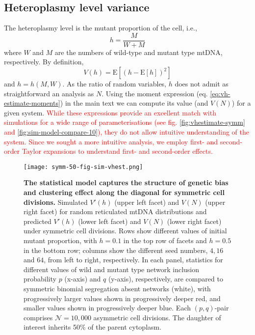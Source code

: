 \documentclass{article}
\begin{document}
\begin{appendices}
\section{Heteroplasmy level variance}\label{app:vh-est}
The heteroplasmy level is the mutant proportion of the cell, i.e.,
\begin{equation*}
    h=\frac{M}{W+M}
\end{equation*}
where $W$ and $M$ are the numbers of wild-type and mutant type mtDNA, respectively. By definition,
\begin{equation*}\label{eq:app-vhest}
    V(h)=\mathrm{E}\left[(h-\mathrm{E}[h])^2\right]
\end{equation*}
and $h=h(M,W)$. As the ratio of random variables, $h$ does not admit as straightforward an analysis as $N$. Using the moment expression (eq. \ref{eq:vh-estimate-moments}) in the main text we can compute its value (and $V(N)$) for a given system. \textcolor{red}{While these expressions provide an excellent match with simulations for a wide range of parameterisations (see fig. \ref{fig:vhestimate-symm} and \ref{fig:sim-model-compare-10}), they do not allow intuitive understanding of the system. Since we sought a more intuitive analysis, we employ first- and second-order Taylor expansions to understand first- and second-order effects.}%


\begin{figure}
\centering
\texttt{[image: symm-50-fig-sim-vhest.png]}
\caption{\textbf{The statistical model captures the structure of genetic bias and clustering effect along the diagonal for symmetric cell divisions.} Simulated $V'(h)$ (upper left facet) and $V(N)$ (upper right facet) for random reticulated mtDNA distributions and predicted $V'(h)$ (lower left facet) and $V(N)$ (lower right facet) under symmetric cell divisions. Rows show different values of initial mutant proportion, with $h=0.1$ in the top row of facets and $h=0.5$ in the bottom row; columns show the different seed numbers, $4, 16$ and $64$, from left to right, respectively. In each panel, statistics for different values of wild and mutant type network inclusion probability $p$ (x-axis) and $q$ (y-axis), respectively, are compared to symmetric binomial segregation absent networks (white), with progressively larger values shown in progressively deeper red, and smaller values shown in progressively deeper blue. Each $(p,q)$-pair comprises $\mathcal{N}=10,000$ asymmetric cell divisions. The daughter of interest inherits 50\% of the parent cytoplasm.}\label{fig:app-vhestimate-symm}
\end{figure}


\end{appendices}
\end{document}
